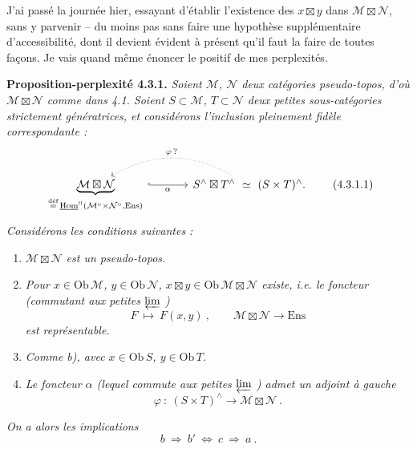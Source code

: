 \documentclass[11pt]{article}
\newcommand{\printedpage}[1]{\if\relax\detokenize{#1}\relax\else\marginpar{\footnotesize p.~#1}\fi}
\newcommand{\msp}[1]{\marginpar{\footnotesize [#1]}}
\newcommand{\uHom}{\underline{\mathrm{Hom}}}
\newcommand{\Ens}{\mathrm{Ens}}
\newcommand{\cM}{\mathcal{M}}
\newcommand{\cN}{\mathcal{N}}
\newcommand{\Ob}{\mathrm{Ob}\,}
\newcommand{\defeq}{\overset{\text{déf}}{=}}
\newcommand{\bt}{\boxtimes}
\begin{document}
J'ai passé la journée hier, essayant d'établir l'existence des $x\bt y$ dans $\cM\bt\cN$, sans y parvenir – du moins pas sans faire une hypothèse supplémentaire d'accessibilité,
\msp{page 65}
dont il devient évident à présent qu'il faut la faire de toutes façons. Je vais quand même énoncer le positif de mes perplexités.

\textbf{Proposition-perplexité 4.3.1.} \textit{Soient $\cM$, $\cN$ deux catégories pseudo-topos, d'où $\cM\bt\cN$ comme dans 4.1. Soient $S\subset\cM$, $T\subset\cN$ deux petites sous-catégories strictement génératrices, et considérons l'inclusion pleinement fidèle correspondante :}
\[
\begin{tikzcd}[column sep=large]
\underbrace{\cM\bt\cN}_{\defeq\, \uHom^{!!}(\cM^{\circ}\times\cN^{\circ},\Ens)} \arrow[r, hook, "\alpha"'] & S^{\wedge}\bt T^{\wedge} \ \simeq\ (S\times T)^{\wedge}. \arrow[l, dotted, bend right, "\varphi\,?"']
\end{tikzcd}
\tag*{(4.3.1.1)}
\]
\textit{Considérons les conditions suivantes :}
\begin{enumerate}[label={}]
\item[\textit{a)}] \textit{$\cM\bt\cN$ est un pseudo-topos.}
\item[\textit{b)}] \textit{Pour $x\in\Ob\cM$, $y\in\Ob\cN$, $x\bt y\in\Ob\cM\bt\cN$ existe, i.e. le foncteur (commutant aux petites $\varprojlim$ )}
\[
F \ \longmapsto\ F(x,y) \ , \qquad \cM\bt\cN \longrightarrow \Ens
\tag*{(4.3.1.2)}
\]
\textit{est représentable.}
\item[\textit{b$'$)}] \textit{Comme b), avec $x\in\Ob S$, $y\in\Ob T$.}
\item[\textit{c)}] \textit{Le foncteur $\alpha$ (lequel commute aux petites $\varprojlim$ ) admet un adjoint à gauche}
\[
\varphi \ :\ (S\times T)^{\wedge} \longrightarrow \cM\bt\cN \ .
\]
\end{enumerate}
\textit{On a alors les implications}
\[
b \ \Longrightarrow\ b' \ \Longleftrightarrow\ c \ \Longrightarrow\ a \ .
\tag*{(4.3.1.3)}
\]

\setcounter{footnote}{6}

\printedpage{9}
\end{document}
